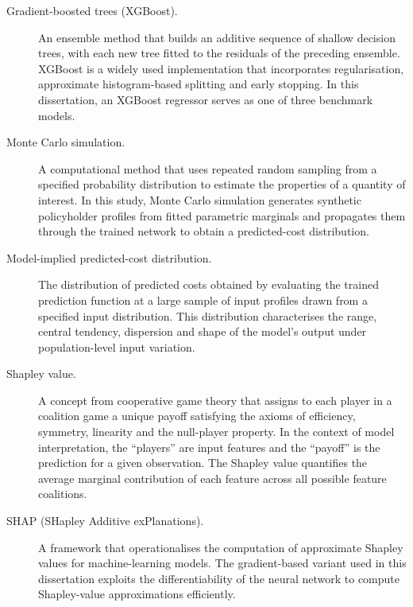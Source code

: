 \begin{description}
    \item[Gradient-boosted trees (XGBoost).]  An ensemble method that
          builds an additive sequence of shallow decision trees, with
          each new tree fitted to the residuals of the preceding
          ensemble.  XGBoost \citep{chen2016xgboost} is a widely used
          implementation that incorporates regularisation, approximate
          histogram-based splitting and early stopping.  In this
          dissertation, an XGBoost regressor serves as one of three
          benchmark models.

    \item[Monte Carlo simulation.]  A computational method that uses
          repeated random sampling from a specified probability
          distribution to estimate the properties of a quantity of
          interest.  In this study, Monte Carlo simulation generates
          synthetic policyholder profiles from fitted parametric
          marginals and propagates them through the trained network to
          obtain a predicted-cost distribution.

    \item[Model-implied predicted-cost distribution.]  The distribution
          of predicted costs obtained by evaluating the trained
          prediction function at a large sample of input profiles drawn
          from a specified input distribution.  This distribution
          characterises the range, central tendency, dispersion and shape
          of the model's output under population-level input variation.

    \item[Shapley value.]  A concept from cooperative game theory that
          assigns to each player in a coalition game a unique payoff
          satisfying the axioms of efficiency, symmetry, linearity and
          the null-player property.  In the context of model
          interpretation, the ``players'' are input features and the
          ``payoff'' is the prediction for a given observation.  The
          Shapley value quantifies the average marginal contribution of
          each feature across all possible feature coalitions.

    \item[SHAP (SHapley Additive exPlanations).]  A framework that
          operationalises the computation of approximate Shapley values
          for machine-learning models.  The gradient-based variant used
          in this dissertation exploits the differentiability of the
          neural network to compute Shapley-value approximations
          efficiently.


\end{description}
